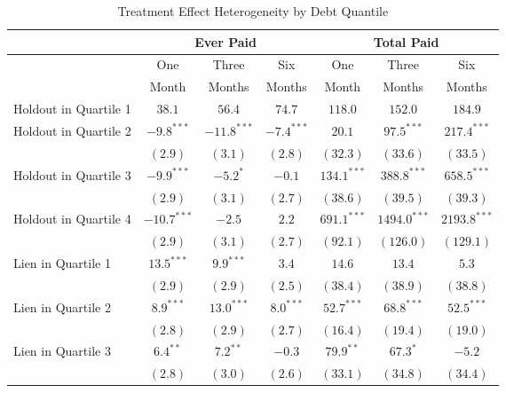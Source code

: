 \documentclass[12pt]{article}
\begin{document}
\begin{table}[htbp]
\caption{Treatment Effect Heterogeneity by Debt Quantile}
\begin{center}
\begin{tabular}{l c c c c c c }
\hline
 & \multicolumn{3}{c}{Ever Paid} & \multicolumn{3}{c}{Total Paid} \\
\hline
 & One & Three & Six & One & Three & Six \\
 & Month & Months & Months & Month & Months & Months \\
\hline
Holdout in Quartile 1 & $38.1$  & $56.4$  & $74.7$ & $118.0$ & $152.0$  & $184.9$  \\
\hline
Holdout in Quartile 2 & $-9.8^{***}$  & $-11.8^{***}$ & $-7.4^{***}$ & $20.1$        & $97.5^{***}$   & $217.4^{***}$  \\
                      & $(2.9)$       & $(3.1)$       & $(2.8)$      & $(32.3)$      & $(33.6)$       & $(33.5)$       \\
Holdout in Quartile 3 & $-9.9^{***}$  & $-5.2^{*}$    & $-0.1$       & $134.1^{***}$ & $388.8^{***}$  & $658.5^{***}$  \\
                      & $(2.9)$       & $(3.1)$       & $(2.7)$      & $(38.6)$      & $(39.5)$       & $(39.3)$       \\
Holdout in Quartile 4 & $-10.7^{***}$ & $-2.5$        & $2.2$        & $691.1^{***}$ & $1494.0^{***}$ & $2193.8^{***}$ \\
                      & $(2.9)$       & $(3.1)$       & $(2.7)$      & $(92.1)$      & $(126.0)$      & $(129.1)$      \\
Lien in Quartile 1    & $13.5^{***}$  & $9.9^{***}$   & $3.4$        & $14.6$        & $13.4$         & $5.3$          \\
                      & $(2.9)$       & $(2.9)$       & $(2.5)$      & $(38.4)$      & $(38.9)$       & $(38.8)$       \\
Lien in Quartile 2    & $8.9^{***}$   & $13.0^{***}$  & $8.0^{***}$  & $52.7^{***}$  & $68.8^{***}$   & $52.5^{***}$   \\
                      & $(2.8)$       & $(2.9)$       & $(2.7)$      & $(16.4)$      & $(19.4)$       & $(19.0)$       \\
Lien in Quartile 3    & $6.4^{**}$    & $7.2^{**}$    & $-0.3$       & $79.9^{**}$   & $67.3^{*}$     & $-5.2$         \\
                      & $(2.8)$       & $(3.0)$       & $(2.6)$      & $(33.1)$      & $(34.8)$       & $(34.4)$       \\

\end{tabular}
\end{center}
\end{table}
\end{document}
